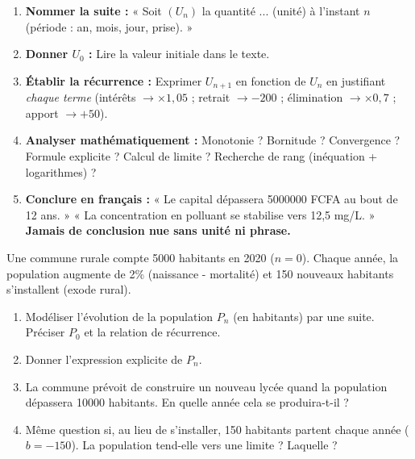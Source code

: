 \documentclass[11pt]{article}
\begin{document}
\begin{enumerate}
    \item \textbf{Nommer la suite :} « Soit $(U_n)$ la quantité ... (unité) à l'instant $n$ (période : an, mois, jour, prise). »
    \item \textbf{Donner $U_0$ :} Lire la valeur initiale dans le texte.
    \item \textbf{Établir la récurrence :} Exprimer $U_{n+1}$ en fonction de $U_n$ en justifiant \emph{chaque terme} (intérêts $\to \times 1{,}05$ ; retrait $\to -200$ ; élimination $\to \times 0{,}7$ ; apport $\to +50$).
    \item \textbf{Analyser mathématiquement :} Monotonie ? Bornitude ? Convergence ? Formule explicite ? Calcul de limite ? Recherche de rang (inéquation + logarithmes) ?
    \item \textbf{Conclure en français :} « Le capital dépassera \num{5 000 000} FCFA au bout de 12 ans. » « La concentration en polluant se stabilise vers 12,5 mg/L. » \textbf{Jamais de conclusion nue sans unité ni phrase.}
\end{enumerate}

\begin{exercice}
Une commune rurale compte \num{5 000} habitants en 2020 ($n=0$). Chaque année, la population augmente de 2\% (naissance - mortalité) et \num{150} nouveaux habitants s'installent (exode rural).
\begin{enumerate}
    \item Modéliser l'évolution de la population $P_n$ (en habitants) par une suite. Préciser $P_0$ et la relation de récurrence.
    \item Donner l'expression explicite de $P_n$.
    \item La commune prévoit de construire un nouveau lycée quand la population dépassera \num{10 000} habitants. En quelle année cela se produira-t-il ?
    \item Même question si, au lieu de s'installer, \num{150} habitants partent chaque année ($b = -150$). La population tend-elle vers une limite ? Laquelle ?
\end{enumerate}
\end{exercice}
\end{document}
